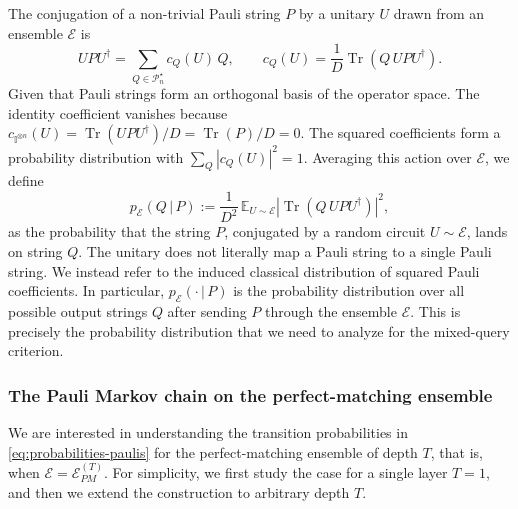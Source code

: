 \documentclass[
    aps,
    superscriptaddress,
    onecolumn,
    10pt,
    prx,
    nofootinbib
]{revtex4-2}
\theoremstyle{namedstatement}
\theoremstyle{plain}
\begin{document}
The conjugation of a non-trivial Pauli string $P$ by a unitary $U$ drawn from an ensemble $\mathcal{E}$ is 
\begin{equation}
    U P U^{\dagger} = \sum_{Q \in \mathcal{P}_n^{\star}} c_Q(U)\, Q,
    \qquad
    c_Q(U) = \frac{1}{D}\operatorname{Tr}\!\left(Q\, U P U^{\dagger}\right).
\end{equation}
Given that Pauli strings form an orthogonal basis of the operator space.
The identity coefficient vanishes because
$c_{\mathbb{I}^{\otimes n}}(U) = \operatorname{Tr}(U P U^{\dagger})/D
= \operatorname{Tr}(P)/D = 0$. The squared coefficients form a probability distribution with $\sum_Q |c_Q(U)|^2=1$. Averaging this action over $\mathcal{E}$, we define
\begin{equation}
\label{eq:probabilities-paulis}
    p_{\mathcal{E}}(Q \,|\, P) := \frac{1}{D^{2}}\, \mathbb{E}_{U \sim \mathcal{E}} \left| \operatorname{Tr}\!\left(Q\, U P U^{\dagger}\right) \right|^{2},
\end{equation}
as the probability that the string $P$, conjugated by a random circuit $U\sim \mathcal{E}$, lands on string $Q$. The unitary does not literally map a Pauli string to a single Pauli string. We instead refer to the induced classical distribution of squared Pauli coefficients. In particular, $p_{\mathcal{E}}(\cdot \,|\, P)$ is the probability distribution over all possible output strings $Q$ after sending $P$ through the ensemble $\mathcal{E}$. This is precisely the probability distribution that we need to analyze for the mixed-query criterion.

\subsubsection{The Pauli Markov chain on the perfect-matching ensemble}\label{sec:Pauli_Mixing}
We are interested in understanding the transition probabilities in \cref{eq:probabilities-paulis} for the perfect-matching ensemble of depth $T$, that is, when $\mathcal{E}=\mathcal{E}_{PM}^{(T)}$. For simplicity, we first study the case for a single layer $T=1$, and then we extend the construction to arbitrary depth $T$.
\end{document}
